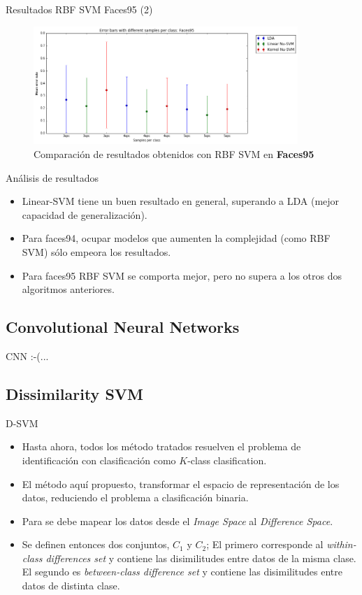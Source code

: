 \documentclass{beamer}
\begin{document}
\begin{frame}{Resultados RBF SVM Faces95 (2)}
\begin{figure}[htpb!]
\centering
\includegraphics[width=10cm]{ksvm_rescomp95}
\caption{Comparación de resultados obtenidos con RBF SVM en \textbf{Faces95}}
\end{figure}
\end{frame}

\begin{frame}{Análisis de resultados}
\begin{itemize}
	\item Linear-SVM tiene un buen resultado en general, superando a LDA (mejor capacidad de generalización).
	\item Para faces94, ocupar modelos que aumenten la complejidad (como RBF SVM) sólo empeora los resultados. 
	\item Para faces95 RBF SVM se comporta mejor, pero no supera a los otros dos algoritmos anteriores.
\end{itemize}
\end{frame}

\subsection{Convolutional Neural Networks}

\begin{frame}{CNN}
:-(...
\end{frame}




\subsection{Dissimilarity SVM}

\begin{frame}{D-SVM}
\begin{itemize}
	\item Hasta ahora, todos los método tratados resuelven el problema de identificación con clasificación como
	$K$-class clasification.
	\item El método aquí propuesto, transformar el espacio de representación de los datos, reduciendo el problema
	a clasificación binaria.
	\item Para se debe mapear los datos desde el \textit{Image Space} al \textit{Difference Space}. 
	\item Se definen entonces dos conjuntos, $C_1$ y $C_2$; El primero corresponde al \textit{within-class differences set} y contiene las disimilitudes entre datos de la misma clase. El segundo es \textit{between-class difference set} y contiene las disimilitudes entre datos de distinta clase.   
\end{itemize}
\end{frame}
\end{document}
